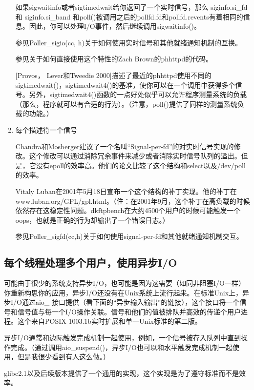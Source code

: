 \documentclass[twoside, xetex]{report}
\begin{document}
\begin{enumerate}
		如果sigwaitinfo或者sigtimedwait给你返回了一个实时信号，那么 siginfo.si\_fd 和 siginfo.si\_band 和poll()被调用之后的pollfd.fd和pollfd.revents有着相同的信息。因此，你可以处理I/O事件，然后继续调用sigwaitinfo()。

		参见Poller\_sigio(cc, h)关于如何使用实时信号和其他就绪通知机制的互换。

		参见关于如何直接使用这个特性的Zach Brown的phhttpd的代码。

		[Provos， Lever和Tweedie 2000]描述了最近的phhttpd使用不同的sigtimedwait()，sigtimedwait4()的基准，使你可以在一个调用中获得多个信号。另外，sigtimedwait4()函数的一点好处似乎可以允许程序测量系统的负载（那么，程序就可以有合适的行为）。（注意，poll()提供了同样的测量系统负载的功能。）

	\item  每个描述符一个信号

		Chandra和Mosberger建议了一个名叫“Signal-per-fd”的对实时信号实现的修改。这个修改可以通过消除冗余事件来减少或者消除实时信号队列的溢出。但是，它没有epoll的效率高。他们的论文比较了这个结构和select以及/dev/poll的效率。

		Vitaly Luban在2001年5月18日宣布一个这个结构的补丁实现。他的补丁在\\www.luban.org/GPL/gpl.html。（住：在2001年9月，这个补丁在高负载的时候依然存在这稳定性问题。dkftpbench在大约4500个用户的时候可能触发一个oops，也就是正确的行为却输出了一个错误日志。）
		
		参见Poller\_sigfd(cc,h)关于如何使用signal-per-fd和其他就绪通知机制交互。
	\end{enumerate}
 
\subsection*{每个线程处理多个用户，使用异步I/O}
		
	可能由于很少的系统支持异步I/O，也可能是因为这需要（如同非阻塞I/O一样）你重新构思你的应用，异步I/O还没有在Unix系统上流行起来。在标准Unix上，异步I/O通过aio\_ 接口提供（看下面的“异步输入输出”的链接），这个接口将一个信号和信号值与每一个I/O操作关联。信号和他们的值被排队并高效的传递个用户进程。这个来自POSIX 1003.1b实时扩展和单一Unix标准的第二版。

	异步I/O通常和边际触发完成机制一起使用，例如，一个信号被存入队列中直到操作完成。（通过调用aio\_suspend()，异步I/O也可以和水平触发完成机制一起使用，但是我很少看到有人这么做。）

	glibc2.1以及后续版本提供了一个通用的实现，这个实现是为了遵守标准而不是效率。
\end{document}
